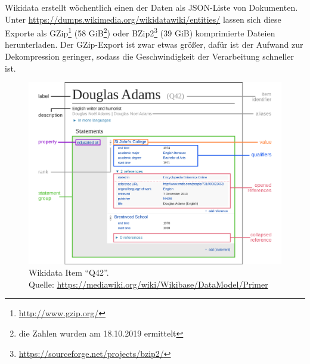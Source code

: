 Wikidata erstellt wöchentlich einen  der Daten als JSON-Liste von Dokumenten.
Unter \url{https://dumps.wikimedia.org/wikidatawiki/entities/} lassen sich diese Exporte als GZip\footnote{\url{http://www.gzip.org/}} (58 GiB\footnote{die Zahlen wurden am 18.10.2019 ermittelt}) oder BZip2\footnote{\url{https://sourceforge.net/projects/bzip2/}} (39 GiB) komprimierte Dateien herunterladen.
Der GZip-Export ist zwar etwas größer, dafür ist der Aufwand zur Dekompression geringer, sodass die Geschwindigkeit der Verarbeitung schneller ist.

\begin{figure}
  \includegraphics[width=\linewidth]{pics/Datamodel_in_Wikidata}
  \caption[Wikidata Item "`Q42"']{Wikidata Item "`Q42"'. \\ \small{Quelle: \url{https://mediawiki.org/wiki/Wikibase/DataModel/Primer}}}
  \label{fig:wd-datamodel}
\end{figure}

